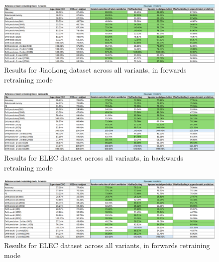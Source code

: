 \documentclass{svproc}
\begin{document}
 
 \begin{figure}
 	\centering
 	\includegraphics[scale=.95]{figures/Fig21_JIAOLONG_2.png}
 	\caption{Results for JiaoLong dataset across all variants, in forwards retraining mode}
 	\label{fig:fig21}
 \end{figure}
 
 
 \begin{figure}
 	\centering
 	\includegraphics[scale=.95]{figures/Fig22_ELEC_1.png}
 	\caption{Results for ELEC dataset across all variants, in backwards retraining mode}
 	\label{fig:fig22}
 \end{figure}
 
 
 \begin{figure}
 	\centering
 	\includegraphics[scale=.95]{figures/Fig23_ELEC_2.png}
 	\caption{Results for ELEC dataset across all variants, in forwards retraining mode}
 	\label{fig:fig23}
 \end{figure}
 
 
\end{document}
